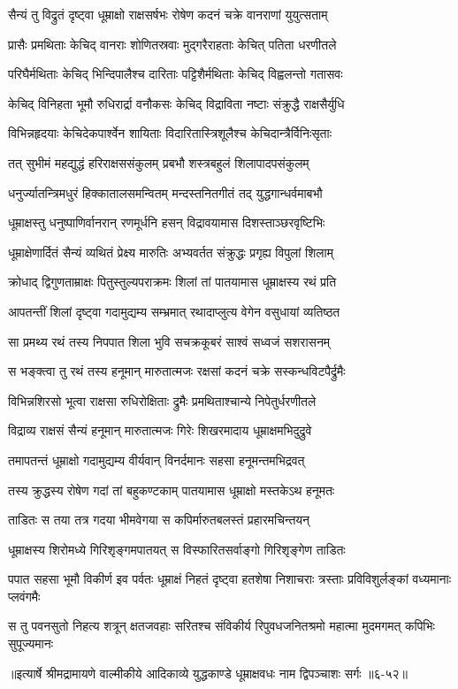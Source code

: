 \twolineshloka
{सैन्यं तु विद्रुतं दृष्ट्वा धूम्राक्षो राक्षसर्षभः}
{रोषेण कदनं चक्रे वानराणां युयुत्सताम्} %

\twolineshloka
{प्रासैः प्रमथिताः केचिद् वानराः शोणितस्रवाः}
{मुद्गरैराहताः केचित् पतिता धरणीतले} %

\twolineshloka
{परिघैर्मथिताः केचिद् भिन्दिपालैश्च दारिताः}
{पट्टिशैर्मथिताः केचिद् विह्वलन्तो गतासवः} %

\twolineshloka
{केचिद् विनिहता भूमौ रुधिरार्द्रा वनौकसः}
{केचिद् विद्राविता नष्टाः संक्रुद्धै राक्षसैर्युधि} %

\twolineshloka
{विभिन्नहृदयाः केचिदेकपार्श्वेन शायिताः}
{विदारितास्त्रिशूलैश्च केचिदान्त्रैर्विनिःसृताः} %

\twolineshloka
{तत् सुभीमं महद्युद्धं हरिराक्षससंकुलम्}
{प्रबभौ शस्त्रबहुलं शिलापादपसंकुलम्} %

\twolineshloka
{धनुर्ज्यातन्त्रिमधुरं हिक्कातालसमन्वितम्}
{मन्दस्तनितगीतं तद् युद्धगान्धर्वमाबभौ} %

\twolineshloka
{धूम्राक्षस्तु धनुष्पाणिर्वानरान् रणमूर्धनि}
{हसन् विद्रावयामास दिशस्ताञ्छरवृष्टिभिः} %

\twolineshloka
{धूम्राक्षेणार्दितं सैन्यं व्यथितं प्रेक्ष्य मारुतिः}
{अभ्यवर्तत संक्रुद्धः प्रगृह्य विपुलां शिलाम्} %

\twolineshloka
{क्रोधाद् द्विगुणताम्राक्षः पितुस्तुल्यपराक्रमः}
{शिलां तां पातयामास धूम्राक्षस्य रथं प्रति} %

\twolineshloka
{आपतन्तीं शिलां दृष्ट्वा गदामुद्यम्य सम्भ्रमात्}
{रथादाप्लुत्य वेगेन वसुधायां व्यतिष्ठत} %

\twolineshloka
{सा प्रमथ्य रथं तस्य निपपात शिला भुवि}
{सचक्रकूबरं साश्वं सध्वजं सशरासनम्} %

\twolineshloka
{स भङ्क्त्वा तु रथं तस्य हनूमान् मारुतात्मजः}
{रक्षसां कदनं चक्रे सस्कन्धविटपैर्द्रुमैः} %

\twolineshloka
{विभिन्नशिरसो भूत्वा राक्षसा रुधिरोक्षिताः}
{द्रुमैः प्रमथिताश्चान्ये निपेतुर्धरणीतले} %

\twolineshloka
{विद्राव्य राक्षसं सैन्यं हनूमान् मारुतात्मजः}
{गिरेः शिखरमादाय धूम्राक्षमभिदुद्रुवे} %

\twolineshloka
{तमापतन्तं धूम्राक्षो गदामुद्यम्य वीर्यवान्}
{विनर्दमानः सहसा हनूमन्तमभिद्रवत्} %

\twolineshloka
{तस्य क्रुद्धस्य रोषेण गदां तां बहुकण्टकाम्}
{पातयामास धूम्राक्षो मस्तकेऽथ हनूमतः} %

\twolineshloka
{ताडितः स तया तत्र गदया भीमवेगया}
{स कपिर्मारुतबलस्तं प्रहारमचिन्तयन्} %

\twolineshloka
{धूम्राक्षस्य शिरोमध्ये गिरिशृङ्गमपातयत्}
{स विस्फारितसर्वाङ्गो गिरिशृङ्गेण ताडितः} %

\threelineshloka
{पपात सहसा भूमौ विकीर्ण इव पर्वतः}
{धूम्राक्षं निहतं दृष्ट्वा हतशेषा निशाचराः}
{त्रस्ताः प्रविविशुर्लङ्कां वध्यमानाः प्लवंगमैः} %

\twolineshloka
{स तु पवनसुतो निहत्य शत्रून् क्षतजवहाः सरितश्च संविकीर्य}
{रिपुवधजनितश्रमो महात्मा मुदमगमत् कपिभिः सुपूज्यमानः} %


॥इत्यार्षे श्रीमद्रामायणे वाल्मीकीये आदिकाव्ये युद्धकाण्डे धूम्राक्षवधः नाम द्विपञ्चाशः सर्गः ॥६-५२॥
